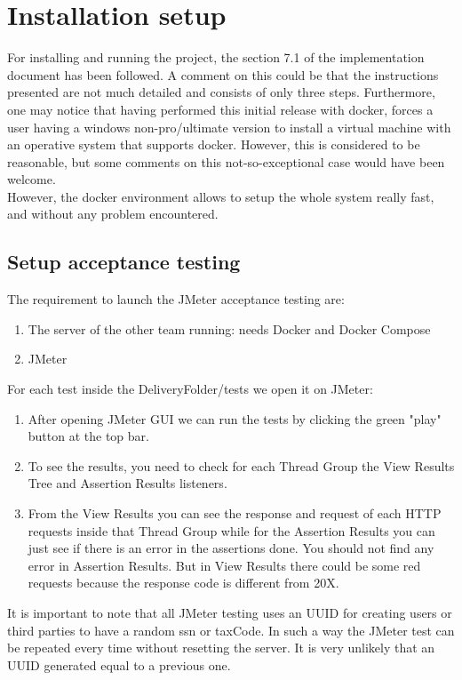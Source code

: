 \section{Installation setup}
For installing and running the project, the section 7.1 of the implementation document has been followed. 
A comment on this could be that the instructions presented are not much detailed and consists of only three steps. 
Furthermore, one may notice that having performed this initial release with docker, forces a user having a windows non-pro/ultimate version to
install a virtual machine with an operative system that supports docker. However, this is considered to be reasonable, but some comments
on this not-so-exceptional case would have been welcome. \\
However, the docker environment allows to setup the whole system really fast, and without any problem encountered. 

\subsection{Setup acceptance testing}
The requirement to launch the JMeter acceptance testing are:
\begin{enumerate}
\item The server of the other team running: needs Docker and Docker Compose
\item JMeter
\end{enumerate}
For each test inside the DeliveryFolder/tests we open it on JMeter:
\begin{enumerate}
\item After opening JMeter GUI we can run the tests by clicking the green "play" button at the top bar.
\item To see the results, you need to check for each Thread Group the View Results Tree and Assertion Results listeners.
\item From the View Results you can see the response and request of each HTTP requests inside that Thread Group while for the Assertion Results you can just see if there is an error in the assertions done. You should not find any error in Assertion Results. But in View Results there could be some red requests because the response code is different from 20X.
\end{enumerate}
It is important to note that all JMeter testing uses an UUID for creating users or third parties to have a random ssn or taxCode. In such a way the JMeter test can be repeated every time without resetting the server. It is very unlikely that an UUID generated equal to a previous one.  
